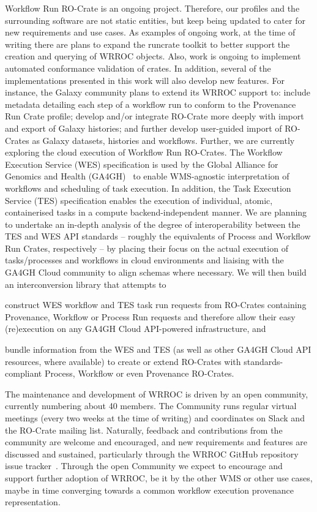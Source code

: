 \documentclass[10pt,letterpaper]{article}
\begin{document}
Workflow Run RO-Crate is an ongoing project. Therefore, our profiles and the surrounding software are not static entities, but keep being updated to cater for new requirements and use cases.
%
As examples of ongoing work, at the time of writing there are plans to expand the runcrate toolkit to better support the creation and querying of WRROC objects.  Also, work is ongoing to implement automated conformance validation of crates.
In addition, several of the implementations presented in this work will also develop new features. For instance, the Galaxy community plans to extend its WRROC support to: include metadata detailing each step of a workflow run to conform to the Provenance Run Crate profile; develop and/or integrate RO-Crate more deeply with import and export of Galaxy histories; and further develop user-guided import of RO-Crates as Galaxy datasets, histories and workflows.
%
Further, we are currently exploring the cloud execution of Workflow Run RO-Crates.
The Workflow Execution Service (WES) specification is used by the Global Alliance for Genomics and Health (GA4GH)~\cite{Rehm 2021} to enable WMS-agnostic interpretation of workflows and scheduling of task execution. In addition, the Task Execution Service (TES) specification enables the execution of individual, atomic, containerised tasks in a compute backend-independent manner.
%
We are planning to undertake an in-depth analysis of the degree of interoperability between the TES and WES API standards -- roughly the equivalents of Process and Workflow Run Crates, respectively -- by placing their focus on the actual execution of tasks/processes and workflows in cloud environments and liaising with the GA4GH Cloud community to align schemas where necessary.
We will then build an interconversion library that attempts to
\begin{inlineenum}
\item construct WES workflow and TES task run requests from RO-Crates containing Provenance, Workflow or Process Run requests and therefore allow their easy (re)execution on any GA4GH Cloud API-powered infrastructure, and
\item bundle information from the WES and TES (as well as other GA4GH Cloud API resources, where available) to create or extend RO-Crates with standards-compliant Process, Workflow or even Provenance RO-Crates.
\end{inlineenum}

The maintenance and development of WRROC is driven by an open community,
currently numbering about 40 members. The Community runs regular virtual
meetings (every two weeks at the time of writing) and coordinates on Slack and
the RO-Crate mailing list.
Naturally, feedback and contributions from the community are welcome and
encouraged, and new requirements and features are discussed and sustained, particularly
through the WRROC GitHub repository issue tracker~\cite{run-crate-repository}.
Through the open Community we expect to encourage and support further adoption of WRROC, be it by the other WMS or other use cases, maybe in time converging towards a common workflow execution provenance representation.
\end{document}
